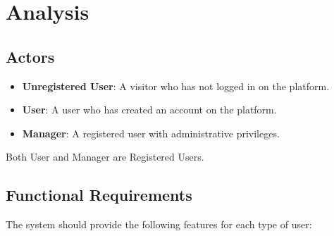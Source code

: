 \chapter{Analysis}

\section{Actors}

\begin{itemize}
    \item \textbf{Unregistered User}: A visitor who has not logged in on the platform.
    
    \item \textbf{User}: A user who has created an account on the platform.
    
    \item \textbf{Manager}: A registered user with administrative privileges.
\end{itemize}

\vspace{\baselineskip}

Both User and Manager are Registered Users.

\section{Functional Requirements}

The system should provide the following features for each type of user:

